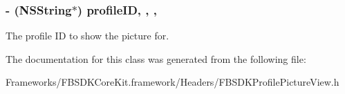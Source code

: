 \subsubsection[{profile\+I\+D}]{\setlength{\rightskip}{0pt plus 5cm}-\/ (N\+S\+String$\ast$) profile\+I\+D\hspace{0.3cm}{\ttfamily [read]}, {\ttfamily [write]}, {\ttfamily [nonatomic]}, {\ttfamily [copy]}}\label{interface_f_b_s_d_k_profile_picture_view_a1b4fb53fb08bb34d83f83d28d3733571}
The profile I\+D to show the picture for. 

The documentation for this class was generated from the following file\+:\begin{DoxyCompactItemize}
\item 
Frameworks/\+F\+B\+S\+D\+K\+Core\+Kit.\+framework/\+Headers/F\+B\+S\+D\+K\+Profile\+Picture\+View.\+h\end{DoxyCompactItemize}
